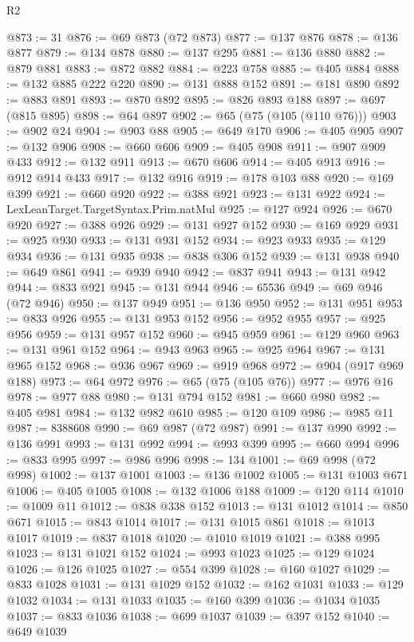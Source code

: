 \begin{lexlean}{R2}
\begin{coremodule}
@873 := 31
@876 := @69 @873 (@72 @873)
@877 := @137 @876
@878 := @136 @877
@879 := @134 @878
@880 := @137 @295
@881 := @136 @880
@882 := @879 @881
@883 := @872 @882
@884 := @223 @758
@885 := @405 @884
@888 := @132 @885 @222 @220
@890 := @131 @888 @152
@891 := @181 @890
@892 := @883 @891
@893 := @870 @892
@895 := @826 @893 @188
@897 := @697 (@815 @895)
@898 := @64 @897
@902 := @65 (@75 (@105 (@110 @76)))
@903 := @902 @24
@904 := @903 @88
@905 := @649 @170
@906 := @405 @905
@907 := @132 @906
@908 := @660 @606
@909 := @405 @908
@911 := @907 @909 @433
@912 := @132 @911
@913 := @670 @606
@914 := @405 @913
@916 := @912 @914 @433
@917 := @132 @916
@919 := @178 @103 @88
@920 := @169 @399
@921 := @660 @920
@922 := @388 @921
@923 := @131 @922
@924 := LexLeanTarget.TargetSyntax.Prim.natMul
@925 := @127 @924
@926 := @670 @920
@927 := @388 @926
@929 := @131 @927 @152
@930 := @169 @929
@931 := @925 @930
@933 := @131 @931 @152
@934 := @923 @933
@935 := @129 @934
@936 := @131 @935
@938 := @838 @306 @152
@939 := @131 @938
@940 := @649 @861
@941 := @939 @940
@942 := @837 @941
@943 := @131 @942
@944 := @833 @921
@945 := @131 @944
@946 := 65536
@949 := @69 @946 (@72 @946)
@950 := @137 @949
@951 := @136 @950
@952 := @131 @951
@953 := @833 @926
@955 := @131 @953 @152
@956 := @952 @955
@957 := @925 @956
@959 := @131 @957 @152
@960 := @945 @959
@961 := @129 @960
@963 := @131 @961 @152
@964 := @943 @963
@965 := @925 @964
@967 := @131 @965 @152
@968 := @936 @967
@969 := @919 @968
@972 := @904 (@917 @969 @188)
@973 := @64 @972
@976 := @65 (@75 (@105 @76))
@977 := @976 @16
@978 := @977 @88
@980 := @131 @794 @152
@981 := @660 @980
@982 := @405 @981
@984 := @132 @982 @610
@985 := @120 @109
@986 := @985 @11
@987 := 8388608
@990 := @69 @987 (@72 @987)
@991 := @137 @990
@992 := @136 @991
@993 := @131 @992
@994 := @993 @399
@995 := @660 @994
@996 := @833 @995
@997 := @986 @996
@998 := 134
@1001 := @69 @998 (@72 @998)
@1002 := @137 @1001
@1003 := @136 @1002
@1005 := @131 @1003 @671
@1006 := @405 @1005
@1008 := @132 @1006 @188
@1009 := @120 @114
@1010 := @1009 @11
@1012 := @838 @338 @152
@1013 := @131 @1012
@1014 := @850 @671
@1015 := @843 @1014
@1017 := @131 @1015 @861
@1018 := @1013 @1017
@1019 := @837 @1018
@1020 := @1010 @1019
@1021 := @388 @995
@1023 := @131 @1021 @152
@1024 := @993 @1023
@1025 := @129 @1024
@1026 := @126 @1025
@1027 := @554 @399
@1028 := @160 @1027
@1029 := @833 @1028
@1031 := @131 @1029 @152
@1032 := @162 @1031
@1033 := @129 @1032
@1034 := @131 @1033
@1035 := @160 @399
@1036 := @1034 @1035
@1037 := @833 @1036
@1038 := @699 @1037
@1039 := @397 @152
@1040 := @649 @1039

\end{coremodule}
\end{lexlean}
